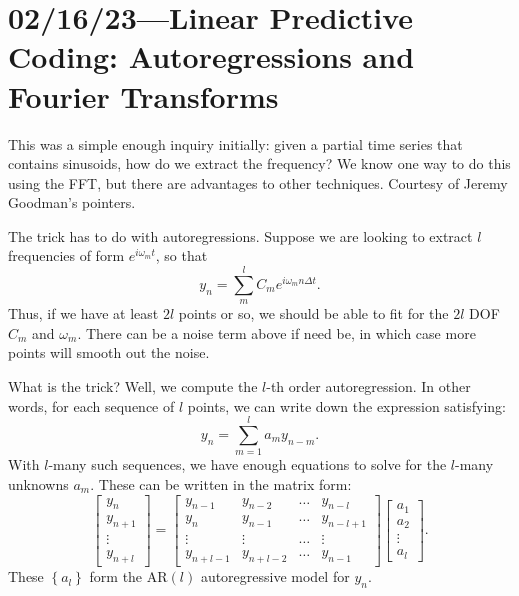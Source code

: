 \documentclass[12pt]{article}
\newcommand*{\z}[1]{\left\{#1\right\}}
\begin{document}
\section{02/16/23---Linear Predictive Coding: Autoregressions and Fourier Transforms}

This was a simple enough inquiry initially: given a partial time series that
contains sinusoids, how do we extract the frequency? We know one way to do this
using the FFT, but there are advantages to other techniques. Courtesy of Jeremy
Goodman's pointers.

The trick has to do with autoregressions. Suppose we are looking to extract $l$
frequencies of form $e^{i \omega_m t}$, so that
\begin{equation}
    y_n = \sum\limits_m^l C_m e^{i\omega_m n \Delta t}.
\end{equation}
Thus, if we have at least $2l$ points or so, we should be able to fit for the
$2l$ DOF $C_m$ and $\omega_m$. There can be a noise term above if need be, in
which case more points will smooth out the noise.

What is the trick? Well, we compute the $l$-th order autoregression. In other
words, for each sequence of $l$ points, we can write down the expression
satisfying:
\begin{equation}
    y_n = \sum\limits_{m = 1}^l a_m y_{n - m}.
\end{equation}
With $l$-many such sequences, we have enough equations to solve for the $l$-many
unknowns $a_m$. These can be written in the matrix form:
\begin{equation}
    \begin{bmatrix}
        y_n\\
        y_{n + 1}\\
        \vdots\\
        y_{n + l}
    \end{bmatrix} =
    \begin{bmatrix}
        y_{n - 1} & y_{n - 2} & \dots & y_{n - l}\\
        y_{n} & y_{n - 1} & \dots & y_{n - l + 1}\\
        \vdots & \vdots & \dots & \vdots\\
        y_{n + l - 1} & y_{n + l - 2} & \dots & y_{n - 1}
    \end{bmatrix}
    \begin{bmatrix}
        a_1\\
        a_2\\
        \vdots\\
        a_l
    \end{bmatrix}.\label{eq:autoreg_def}
\end{equation}
These $\z{a_l}$ form the $\mathrm{AR}(l)$ autoregressive model for $y_n$.
\end{document}
